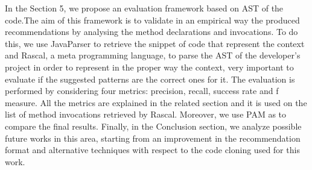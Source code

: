 In the Section 5, we propose an evaluation framework based on AST of the code.The aim of this framework is to validate in an empirical way the produced recommendations by analysing the method declarations and invocations. To do this, we use JavaParser to retrieve the snippet of code that represent the context and Rascal, a meta programming language, to parse the AST of the developer's project in order to represent in the proper way the context, very important to evaluate if the suggested patterns are the correct ones for it. The evaluation is performed by considering four metrics: precision, recall, success rate and f measure. All the metrics are explained in the related section and it is used on the list of method invocations retrieved by Rascal. Moreover, we use PAM as to compare the final results. Finally, in the Conclusion section, we analyze possible future works in this area, starting from an improvement in the recommendation format and alternative techniques with respect to the code cloning used for this work.
